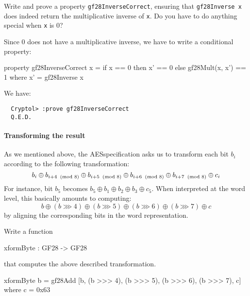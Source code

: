 \begin{Exercise}\label{ex:gfmi:1}
  Write and prove a property {\tt gf28InverseCorrect}, ensuring that
  {\tt gf28Inverse x} does indeed return the multiplicative inverse of
  {\tt x}.  Do you have to do anything special when {\tt x} is $0$?
\end{Exercise}
\begin{Answer}
  Since $0$ does not have a multiplicative inverse, we have to write a
  conditional property:
\begin{code}
  property gf28InverseCorrect x =
      if x == 0 then x' == 0 else gf28Mult(x, x') == 1
    where x' = gf28Inverse x
\end{code}
We have:
\begin{Verbatim}
  Cryptol> :prove gf28InverseCorrect
  Q.E.D.
\end{Verbatim}
\end{Answer}

\paragraph*{Transforming the result} As we mentioned above, the
AES\indAES specification asks us to transform each bit $b_i$ according
to the following transformation:
$$
 b_i \oplus b_{i+4\imod{8}} \oplus b_{i+5\imod{8}} \oplus b_{i+6\imod{8}} \oplus b_{i+7\imod{8}} \oplus c_i
$$
For instance, bit $b_5$ becomes $b_5 \oplus b_1 \oplus b_2 \oplus b_3
\oplus c_5$.  When interpreted at the word level, this basically
amounts to computing:
$$
 b \oplus (b \ggg 4) \oplus (b \ggg 5) \oplus (b \ggg 6) \oplus (b \ggg 7) \oplus c
$$
by aligning the corresponding bits in the word representation.


\begin{Exercise}\label{ex:aessbytes:0}
Write a function
\begin{code}
  xformByte : GF28 -> GF28
\end{code}
that computes the above described transformation.
\end{Exercise}
\begin{Answer}
\begin{code}
  xformByte b = gf28Add [b, (b >>> 4), (b >>> 5),
                         (b >>> 6), (b >>> 7), c]
    where c = 0x63
\end{code}
\end{Answer}

